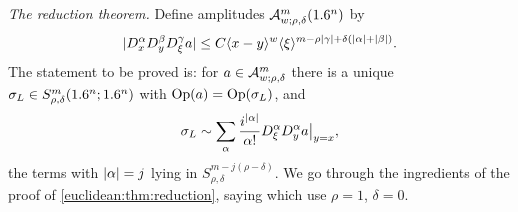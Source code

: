 \emph{The reduction theorem.} Define amplitudes $\mathcal{A}^{m}_{w;\rho,\delta}(1.6^n)$ by
\begin{equation*}
  \lvert D^\alpha_xD^\beta_yD^\gamma_\xi a\rvert\le C\langle x-y\rangle^w\langle \xi\rangle^{m-\rho\lvert \gamma\rvert+\delta(\lvert \alpha\rvert+\lvert \beta\rvert)}.
\end{equation*}
The statement to be proved is: for $a\in\mathcal{A}^{m}_{w;\rho,\delta}$ there is a unique
$\sigma_L\in S^m_{\rho,\delta}(1.6^n;1.6^n)$ with $\operatorname{Op}(a)=\operatorname{Op}(\sigma_L)$, and
\begin{equation*}
  \sigma_L\sim\sum_\alpha\frac{i^{\lvert \alpha\rvert}}{\alpha!}D^\alpha_\xi D^\alpha_ya\big|_{y=x},
\end{equation*}
the terms with $\lvert \alpha\rvert=j$ lying in $S^{m-j(\rho-\delta)}_{\rho,\delta}$. We go through
the ingredients of the proof of \cref{euclidean:thm:reduction}, saying which use $\rho=1$,
$\delta=0$.

